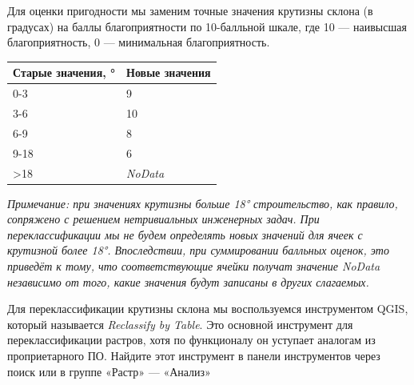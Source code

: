 \documentclass[
  12pt,
]{book}
\begin{document}
Для оценки пригодности мы заменим точные значения крутизны склона (в градусах) на баллы благоприятности по 10-балльной шкале, где 10 --- наивысшая благоприятность, 0 --- минимальная благоприятность.

\begin{longtable}[]{@{}ll@{}}
\toprule
Старые значения, ° & Новые значения \\
\midrule
\endhead
0-3 & 9 \\
3-6 & 10 \\
6-9 & 8 \\
9-18 & 6 \\
\textgreater18 & \emph{NoData} \\
\bottomrule
\end{longtable}

\emph{Примечание: при значениях крутизны больше 18° строительство, как правило, сопряжено с решением нетривиальных инженерных задач. При переклассификации мы не будем определять новых значений для ячеек с крутизной более 18°. Впоследствии, при суммировании балльных оценок, это приведёт к тому, что соответствующие ячейки получат значение NoData независимо от того, какие значения будут записаны в других слагаемых.}

Для переклассификации крутизны склона мы воспользуемся инструментом QGIS, который называется \emph{Reclassify by Table}. Это основной инструмент для переклассификации растров, хотя по функционалу он уступает аналогам из проприетарного ПО. Найдите этот инструмент в панели инструментов через поиск или в группе «Растр» --- «Анализ»
\end{document}
